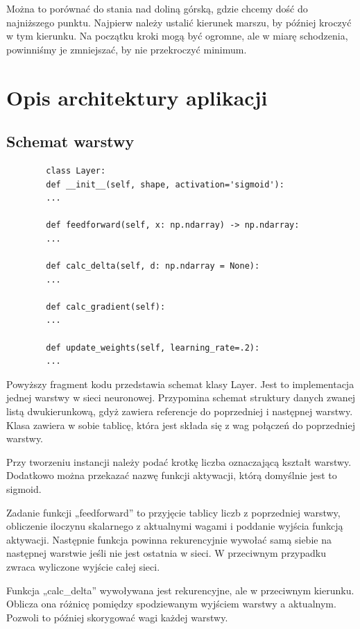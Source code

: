 \documentclass{report}
\begin{document}
    Można to porównać do stania nad doliną górską, gdzie chcemy dość do najniższego punktu.
    Najpierw należy ustalić kierunek marszu, by później kroczyć w tym kierunku.
    Na początku kroki mogą być ogromne, ale w miarę schodzenia, powinniśmy je zmniejszać, by nie przekroczyć minimum.

    \chapter{Opis architektury aplikacji}\label{ch:opisArchitekturyAplikacji}

    \section{Schemat warstwy}\label{sec:schematWarstwy}

    \begin{lstlisting}
        class Layer:
        def __init__(self, shape, activation='sigmoid'):
        ...

        def feedforward(self, x: np.ndarray) -> np.ndarray:
        ...

        def calc_delta(self, d: np.ndarray = None):
        ...

        def calc_gradient(self):
        ...

        def update_weights(self, learning_rate=.2):
        ...
    \end{lstlisting}
    \label{Schemat klasy Layer}

    Powyższy fragment kodu przedstawia schemat klasy Layer.
    Jest to implementacja jednej warstwy w sieci neuronowej.
    Przypomina schemat struktury danych zwanej listą dwukierunkową, gdyż zawiera referencje do poprzedniej i następnej warstwy.
    Klasa zawiera w sobie tablicę, która jest składa się z wag połączeń do poprzedniej warstwy.

    Przy tworzeniu instancji należy podać krotkę liczba oznaczającą kształt warstwy.
    Dodatkowo można przekazać nazwę funkcji aktywacji, którą domyślnie jest to sigmoid.

    Zadanie funkcji „feedforward” to przyjęcie tablicy liczb z poprzedniej warstwy, obliczenie iloczynu skalarnego z aktualnymi wagami i poddanie wyjścia funkcją aktywacji.
    Następnie funkcja powinna rekurencyjnie wywołać samą siebie na następnej warstwie jeśli nie jest ostatnia w sieci.
    W przeciwnym przypadku zwraca wyliczone wyjście całej sieci.

    Funkcja „calc\_delta” wywoływana jest rekurencyjne, ale w przeciwnym kierunku.
    Oblicza ona różnicę pomiędzy spodziewanym wyjściem warstwy a aktualnym.
    Pozwoli to później skorygować wagi każdej warstwy.
\end{document}
